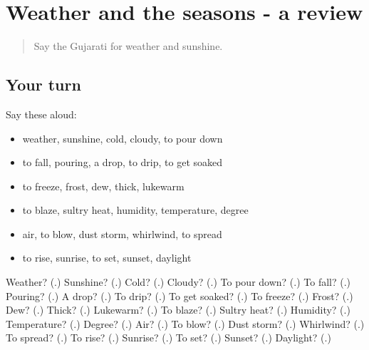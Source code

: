 \section[(dialogue)]{Weather and the seasons - a review}

\label{lesson:GU-R218-review-213-218}



\begin{quote}
Say the Gujarati for weather and sunshine.
\end{quote}

\subsection*{Your turn}
Say these aloud:

\begin{itemize}
\raggedright
  \item weather, sunshine, cold, cloudy, to pour down
  \item to fall, pouring, a drop, to drip, to get soaked
  \item to freeze, frost, dew, thick, lukewarm
  \item to blaze, sultry heat, humidity, temperature, degree
  \item air, to blow, dust storm, whirlwind, to spread
  \item to rise, sunrise, to set, sunset, daylight
\end{itemize}

\begin{tcolorbox}[breakable,colback=teal!4,colframe=teal!35!black,title={Before you move on}]
Weather? (\textbf{}.) Sunshine? (\textbf{}.) Cold? (\textbf{}.) Cloudy? (\textbf{}.) To pour down? (\textbf{}.) To fall? (\textbf{}.) Pouring? (\textbf{}.) A drop? (\textbf{}.) To drip? (\textbf{}.) To get soaked? (\textbf{}.) To freeze? (\textbf{}.) Frost? (\textbf{}.) Dew? (\textbf{}.) Thick? (\textbf{}.) Lukewarm? (\textbf{}.) To blaze? (\textbf{}.) Sultry heat? (\textbf{}.) Humidity? (\textbf{}.) Temperature? (\textbf{}.) Degree? (\textbf{}.) Air? (\textbf{}.) To blow? (\textbf{}.) Dust storm? (\textbf{}.) Whirlwind? (\textbf{}.) To spread? (\textbf{}.) To rise? (\textbf{}.) Sunrise? (\textbf{}.) To set? (\textbf{}.) Sunset? (\textbf{}.) Daylight? (\textbf{}.)
\end{tcolorbox}
